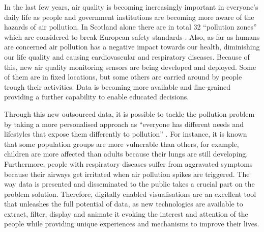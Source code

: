In the last few years, air quality is becoming increasingly important in everyone's daily life as people and government institutions are becoming more aware of the hazards of air pollution. In Scotland alone there are in total 32 ``pollution zones'' which are considered to break European safety standards \cite{Foe-scotland.org.uk}. Also, as far as humans are concerned air pollution has a negative impact towards our health, diminishing our life quality and causing cardiovascular and respiratory diseases. Because of this, new air quality monitoring sensors are being developed and deployed. Some of them are in fixed locations, but some others are carried around by people trough their activities. Data is becoming more available and fine-grained providing a further capability to enable educated decisions.

Through this new outsourced data, it is possible to tackle the pollution problem by taking a  more personalised approach as ``everyone has different needs and lifestyles that expose them differently to pollution'' \cite{Vazquez2016}. For instance, it is known that some population groups are more vulnerable than others, for example, children are more affected than adults because their lungs are still developing. Furthermore, people with respiratory diseases suffer from aggravated symptoms because their airways get irritated when air pollution spikes are triggered. The way data is presented and disseminated to the public takes a crucial part on the problem solution. Therefore, digitally enabled visualisations are an excellent tool that unleashes the full potential of data, as new technologies are available to extract, filter, display and animate it evoking the interest and attention of the people while providing unique experiences and mechanisms to improve their lives.

\iffalse
The effects of air pollution on human health are still complex to understand and there is much research ongoing on the combination short and long term effects upon a person's health. 
\fi
